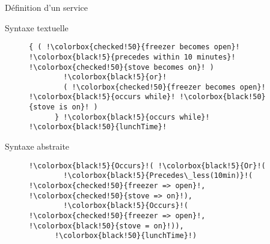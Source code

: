 \begin{frame}[fragile]{Définition d'un service}
\addtocounter{framenumber}{-1}

  \begin{coloredbox}[black]{Syntaxe textuelle}
  \begin{figure}[h]
    \begin{lstlisting}[language=MaloyaText,basicstyle=\ttfamily\footnotesize,escapechar=!]
      { ( !\colorbox{checked!50}{freezer becomes open}! !\colorbox{black!5}{precedes within 10 minutes}! !\colorbox{checked!50}{stove becomes on}! )
        !\colorbox{black!5}{or}!
        ( !\colorbox{checked!50}{freezer becomes open}! !\colorbox{black!5}{occurs while}! !\colorbox{black!50}{stove is on}! ) 
      } !\colorbox{black!5}{occurs while}! !\colorbox{black!50}{lunchTime}!
    \end{lstlisting}
  \end{figure}
\end{coloredbox}
 \begin{coloredbox}[black]{Syntaxe abstraite}
  \begin{figure}[!h]
    \begin{lstlisting}[language=Maloya,basicstyle=\ttfamily\footnotesize,escapechar=!]
      !\colorbox{black!5}{Occurs}!( !\colorbox{black!5}{Or}!(
        !\colorbox{black!5}{Precedes\_less(10min)}!( !\colorbox{checked!50}{freezer => open}!, !\colorbox{checked!50}{stove => on}!),
        !\colorbox{black!5}{Occurs}!( !\colorbox{checked!50}{freezer => open}!, !\colorbox{black!50}{stove = on}!)),
      !\colorbox{black!50}{lunchTime}!)
    \end{lstlisting}
  \end{figure}
\end{coloredbox}
\end{frame}


